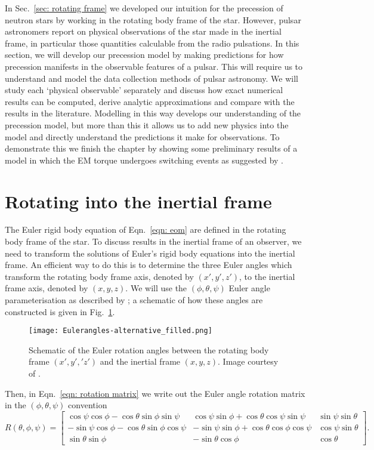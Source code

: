 \documentclass[../full_thesis/full_thesis.tex]{subfiles}
\begin{document}
In Sec.~\ref{sec: rotating frame} we developed our intuition for the precession
of neutron stars by working in the rotating body frame of the star.  However,
pulsar astronomers report on physical observations of the star made in the
inertial frame, in particular those quantities calculable from the radio
pulsations. In this section, we will develop our precession model by making
predictions for how precession manifests in the observable features of a
pulsar. This will require us to understand and model the data collection
methods of pulsar astronomy. We will study each `physical observable' separately
and discuss how exact numerical results can be computed, derive analytic
approximations and compare with the results in the literature.
Modelling in this way develops our understanding of the precession model, but
more than this it allows us to add new physics into the model and directly
understand the predictions it make for observations. To demonstrate this we
finish the chapter by showing some preliminary results of a model in which the
EM torque undergoes switching events as suggested by \citet{Lyne2010}.

\section{Rotating into the inertial frame}

The Euler rigid body equation of Eqn.~\eqref{eqn: eom} are defined in the
rotating body frame of the star. To discuss results in the inertial frame of an
observer, we need to transform the solutions of Euler's rigid body equations
into the inertial frame.  An efficient way to do this is to determine the three
Euler angles which transform the rotating body frame axis, denoted by $(x',y',
z')$, to the inertial frame axis, denoted by $(x, y, z)$. We will use the
$(\phi, \theta, \psi)$ Euler
angle parameterisation as described by \citet{Landau1969}; a schematic of how
these angles are constructed is given in Fig.~\ref{fig: Euler}.
\begin{figure}[ht]
\centering
\texttt{[image: Eulerangles-alternative\_filled.png]}
\caption{Schematic of the Euler rotation angles between the rotating body
frame $(x', y', 'z')$ and the inertial frame $(x, y, z)$. Image courtesy of
 \citet{WikipediaEuler}.}
\label{fig: Euler}
\end{figure}
Then, in Eqn.~\eqref{eqn: rotation matrix} we write out the Euler angle
rotation matrix in the $(\phi, \theta, \psi)$ convention
\begin{equation}
R(\theta, \phi, \psi) = \left[
\begin{array}{ccc}
\cos\psi \cos\phi - \cos\theta \sin\phi \sin \psi &
\cos\psi \sin \phi + \cos\theta \cos \psi \sin \psi &
\sin \psi \sin\theta \\
-\sin\psi \cos\phi - \cos\theta\sin\phi\cos\psi &
-\sin\psi\sin\phi + \cos\theta\cos\phi\cos\psi &
\cos\psi \sin\theta \\
\sin\theta\sin\phi &
-\sin\theta \cos\phi &
\cos\theta
\end{array}
\right].
\label{eqn: rotation matrix}
\end{equation}
\end{document}
